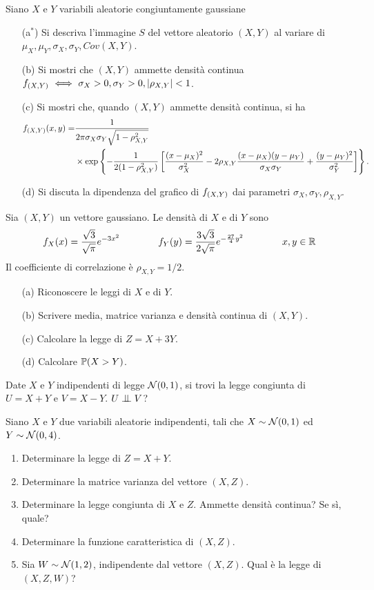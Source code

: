 \Esercizio{} %
Siano $X$ e $Y$ variabili aleatorie congiuntamente gaussiane
\begin{enumerate}
\item [(a$^*$)] Si descriva l'immagine $S$ del vettore aleatorio $(X,Y)$ al variare di $\mu_X,\mu_Y,\sigma_X,\sigma_Y, Cov(X,Y)$.
\item [(b)] Si mostri che $(X,Y)$ ammette densità continua $f_{(X,Y)}\ \Longleftrightarrow\ \sigma_X>0,\sigma_Y>0,|\rho_{X,Y}|<1$.
\item [(c)] Si mostri che, quando $(X,Y)$ ammette densità continua, si ha
\begin{gather*}
\begin{aligned}
f_{(X,Y)}(x,y)=&\frac{1}{2\pi\sigma_X\sigma_Y\sqrt{1-\rho_{X,Y}^2}}\\ &\times\exp\left\{-\frac{1}{2(1-\rho_{X,Y}^2)}\left[\frac{(x-\mu_X)^2}{\sigma_X^2}-2\rho_{X,Y}\frac{(x-\mu_X)(y-\mu_Y)}{\sigma_X\sigma_Y}+\frac{(y-\mu_Y)^2}{\sigma_Y^2}  \right]\right\}.
\end{aligned}
\end{gather*}
\item [(d)] Si discuta la dipendenza del grafico di $f_{(X,Y)}$ dai parametri $\sigma_X,\sigma_Y,\rho_{X,Y}$.
\end{enumerate}

\Esercizio{} %
Sia $(X,Y)$ un vettore gaussiano. Le densità di $X$ e di $Y$ sono
\[
f_X(x)=\frac{\sqrt{3}}{\sqrt{\pi}}e^{-3x^2}\qquad\qquad f_Y(y)=\frac{3\sqrt{3}}{2\sqrt{\pi}}e^{-\frac{27}{4}y^2}\qquad\qquad x,y\in\mathbb{R}
\]
Il coefficiente di correlazione è $\rho_{X,Y}=1/2$.
\begin{enumerate}
\item [(a)] Riconoscere le leggi di $X$ e di $Y$.
\item [(b)] Scrivere media, matrice varianza e densità continua di $(X,Y)$.
\item [(c)] Calcolare la legge di $Z=X+3Y$.
\item [(d)] Calcolare $\mathbb{P}(X>Y)$.
\end{enumerate}

\Esercizio{} %
Date $X$ e $Y$ indipendenti di legge $\mathcal{N}(0,1)$, si trovi la legge congiunta di $U=X+Y$ e $V=X-Y$. $U\indep V$?

\Esercizio{} %
Siano $X$ e $Y$ due variabili aleatorie indipendenti, tali che $X\sim\mathcal{N}(0,1)$ ed $Y\sim\mathcal{N}(0,4)$.
\begin{enumerate}
\item Determinare la legge di $Z=X+Y$.
\item Determinare la matrice varianza del vettore $(X,Z)$.
\item Determinare la legge congiunta di $X$ e $Z$. Ammette densità continua? Se sì, quale?
\item Determinare la funzione caratteristica di $(X,Z)$.
\item Sia $W\sim\mathcal{N}(1,2)$, indipendente dal vettore $(X,Z)$. Qual è la legge di $(X,Z,W)$?
\end{enumerate}

